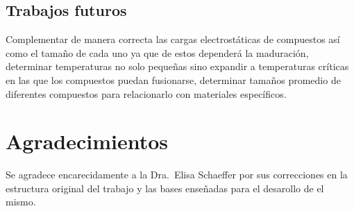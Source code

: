 \documentclass[3pt,twocolumn]{elsarticle}
\begin{document}
\subsection{Trabajos futuros}
Complementar de manera correcta las cargas electrostáticas de compuestos así como el tamaño de cada uno ya que de estos dependerá la maduración, determinar temperaturas no solo pequeñas sino expandir a temperaturas críticas en las que los compuestos puedan fusionarse, determinar tamaños promedio de diferentes compuestos para relacionarlo con materiales específicos.
\section{Agradecimientos}
Se agradece encarecidamente a la Dra.\ Elisa Schaeffer por sus correcciones en la estructura original del trabajo y las bases enseñadas para el desarollo de el mismo.


\end{document}
